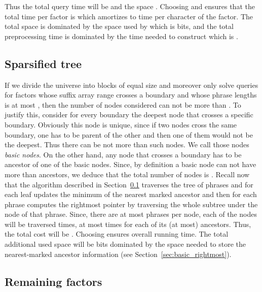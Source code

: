 \documentclass[11pt,runningheads]{llncs}
\begin{document}
{Thus the total query 
time will be  and the space . 
Choosing  and  ensures that the total 
time per factor is  which amortizes to 
time per character of the factor. 
The total space is dominated by the space used by  
which is  bits, and the total preprocessing time is dominated by the time needed 
to construct  which is  . 


\subsection{Sparsified tree}
\label{sec:rightmost_sparse_tree}
If we divide the universe  into blocks 
of equal size  and moreover only solve queries
for factors  
whose suffix array range crosses a boundary and whose phrase 
lengths is at most , then the number of nodes considered 
can not be more than . To justify 
this, consider for every boundary the deepest node that crosses 
a specific boundary. Obviously this node is unique, since if two nodes 
cross the same boundary, one has to be parent of the other
and then one of them would not be the deepest. 
Thus there can be not more than  such nodes. 
We call those nodes {\em basic nodes}. On the other hand, 
any node that crosses a boundary has to be ancestor of one of the basic 
nodes. Since, by definition a basic node can not have more than  ancestors, 
we deduce that the total number of nodes is . 
Recall now that the algorithm described in Section~\ref{sec:rightmost_sparse_tree} traverses 
the tree of phrases and for each leaf updates the minimum of the nearest 
marked ancestor and then for each phrase computes the rightmost pointer 
by traversing the whole subtree under the node of that phrase. 
Since, there are at most  phrases per node, 
each of the  nodes will be traversed  
times, at most  times for each of its (at most)  ancestors. 
Thus, the total cost will be . 
Choosing  ensures  overall running time. 
The total additional used space will be  bits dominated by the space
needed to store the nearest-marked ancestor information (see Section~\ref{sec:basic_rightmost}). 

\subsection{Remaining factors}
\label{sec:rightmost_rem_factors}

}
\end{document}
